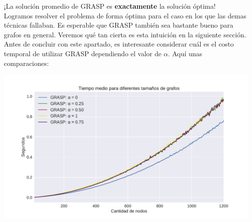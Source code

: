 ¡La solución promedio de GRASP es \textbf{exactamente} la solución óptima! \\

Logramos resolver el problema de forma óptima para el caso en los que las demas técnicas fallaban. Es esperable que GRASP también sea bastante bueno para grafos en general. Veremos qué tan cierta es esta intuición en la siguiente sección. \\

Antes de concluir con este apartado, es interesante considerar cuál es el costo temporal de utilizar GRASP dependiendo el valor de $\alpha$. Aquí unas comparaciones:

{\centering
    \includegraphics[width=1\textwidth]{informe/imgs/exp_malo_tiempo_grasp.pdf}
}

